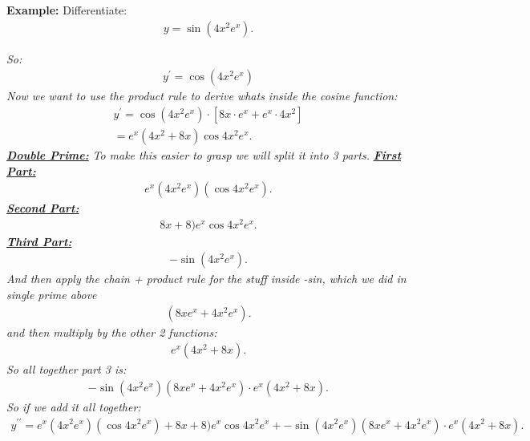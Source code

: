 \documentclass{report}
\begin{document}
  \bigbreak \noindent 
  \begin{mdframed}
    \textbf{Example:} Differentiate:
    \begin{align*}
      y = \sin{(4x^{2}e^{x})}
    .\end{align*}
  \end{mdframed}
  \bigbreak \noindent
  \textit{So:}
  \begin{align*}
   y^{\prime} = \cos{(4x^{2}e^{x})}
  \end{align*}
  \bigbreak \noindent 
  \textit{Now we want to use the product rule to derive whats inside the cosine function:}
  \begin{align*}
    y^{\prime} =  \cos{(4x^{2}e^{x})} \cdot [8x\cdot e^{x} + e^{x}\cdot 4x^{2}] \\
    = e^{x}(4x^{2}+8x)\cos{4x^{2}e^{x}}
  .\end{align*}
  \bigbreak \noindent 
  \bigbreak \noindent 
  \textbf{\textit{\underline{Double Prime:}}} \textit{To make this easier to grasp we will split it into 3 parts.}
  \bigbreak \noindent 
  \textbf{\textit{\underline{First Part:}}}
  \begin{align*}
    e^{x}(4x^{2}e^{x})(\cos{4x^{2}e^{x}})
  .\end{align*}
  \bigbreak \noindent 
  \textbf{\textit{\underline{Second Part:}}}
  \begin{align*}
    8x+8)e^{x}\cos{4x^{2}e^{x}}
  .\end{align*}
  \bigbreak \noindent 
  \textbf{\textit{\underline{Third Part:}}}
  \begin{align*}
    -\sin{(4x^{2}e^{x})}
  .\end{align*}
  \bigbreak \noindent 
  \textit{And then apply the chain + product rule for the stuff inside -sin, which we did in single prime above}
  \begin{align*}
    (8xe^{x}+4x^{2}e^{x})
  .\end{align*}
  \bigbreak \noindent 
  \textit{and then multiply by the other 2 functions:}
  \begin{align*}
    e^{x}(4x^{2}+8x)
  .\end{align*}
  \bigbreak \noindent 
  \textit{So all together part 3 is:}
  \begin{align*}
    -\sin{(4x^{2}e^{x})}(8xe^{x}+4x^{2}e^{x})\cdot e^{x}(4x^{2}+8x)
  .\end{align*}
  \bigbreak \noindent 
  \textit{So if we add it all together:}
  \begin{align*}
    y^{\prime\prime} = e^{x}(4x^{2}e^{x})(\cos{4x^{2}e^{x}}) + 8x+8)e^{x}\cos{4x^{2}e^{x}} +-\sin{(4x^{2}e^{x})}(8xe^{x}+4x^{2}e^{x}) \cdot e^{x}(4x^{2}+8x)
  .\end{align*}
\end{document}
